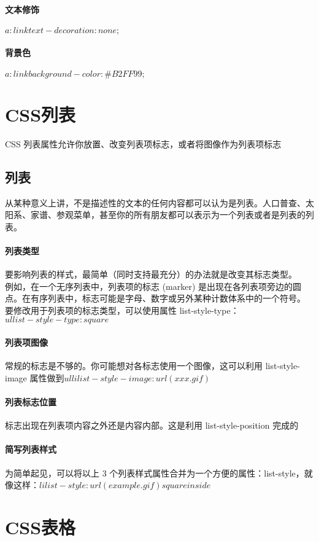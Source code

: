 \documentclass[10pt,UTF8]{ctexart}
\begin{document}
\paragraph{文本修饰}$a:link {text-decoration:none;}$
\paragraph{背景色}$a:link {background-color:\#B2FF99;}$
\section{CSS列表}
CSS 列表属性允许你放置、改变列表项标志，或者将图像作为列表项标志
\subsection{列表}
从某种意义上讲，不是描述性的文本的任何内容都可以认为是列表。人口普查、太阳系、家谱、参观菜单，甚至你的所有朋友都可以表示为一个列表或者是列表的列表。
\paragraph{列表类型}要影响列表的样式，最简单（同时支持最充分）的办法就是改变其标志类型。\\
例如，在一个无序列表中，列表项的标志 (marker) 是出现在各列表项旁边的圆点。在有序列表中，标志可能是字母、数字或另外某种计数体系中的一个符号。\\
要修改用于列表项的标志类型，可以使用属性 list-style-type：$ul {list-style-type : square}$
\paragraph{列表项图像}常规的标志是不够的。你可能想对各标志使用一个图像，这可以利用 list-style-image 属性做到$ul li {list-style-image : url(xxx.gif)}$
\paragraph{列表标志位置}标志出现在列表项内容之外还是内容内部。这是利用 list-style-position 完成的
\paragraph{简写列表样式}为简单起见，可以将以上 3 个列表样式属性合并为一个方便的属性：list-style，就像这样：$li {list-style : url(example.gif) square inside}$
\section{CSS表格}
\end{document}
